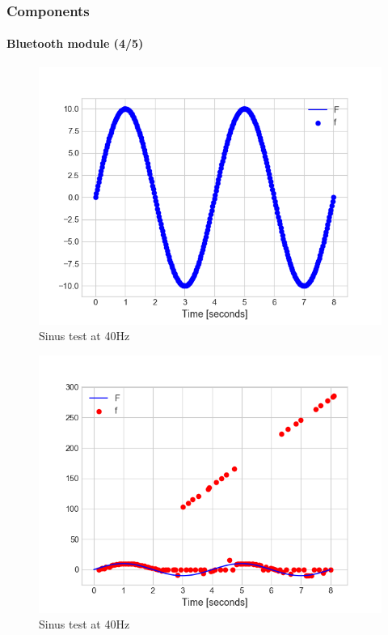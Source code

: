 \documentclass[10pt]{beamer}
\begin{document}

\begin{frame}
\frametitle{Components}
\framesubtitle{Bluetooth module (4/5)}
\begin{multicols}{2}
\begin{figure}
\centering
\includegraphics[scale=0.4]{figures/sending-40hz.png}
\caption{Sinus test at 40Hz}
\end{figure}
\columnbreak
\begin{figure}
\centering
\includegraphics[scale=0.4]{figures/reception-40hz.png}
\caption{Sinus test at 40Hz}
\end{figure}
\end{multicols}
\end{frame}
\end{document}
